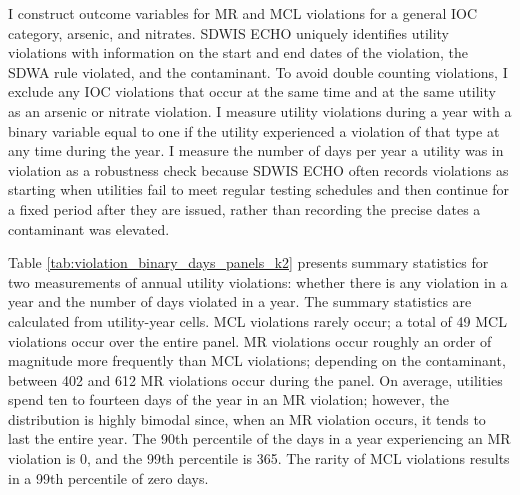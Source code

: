 \documentclass[12pt]{article}
\begin{document}
I construct outcome variables for MR and MCL violations for a general IOC category, arsenic, and nitrates. SDWIS ECHO uniquely identifies utility violations with information on the start and end dates of the violation, the SDWA rule violated, and the contaminant. To avoid double counting violations, I exclude any IOC violations that occur at the same time and at the same utility as an arsenic or nitrate violation. I measure utility violations during a year with a binary variable equal to one if the utility experienced a violation of that type at any time during the year. I measure the number of days per year a utility was in violation as a robustness check because SDWIS ECHO often records violations as starting when utilities fail to meet regular testing schedules and then continue for a fixed period after they are issued, rather than recording the precise dates a contaminant was elevated. 


Table \ref{tab:violation_binary_days_panels_k2} presents summary statistics for two measurements of annual utility violations: whether there is any violation in a year and the number of days violated in a year. The summary statistics are calculated from utility-year cells. MCL violations rarely occur; a total of 49 MCL violations occur over the entire panel. MR violations occur roughly an order of magnitude more frequently than MCL violations; depending on the contaminant, between 402 and 612 MR violations occur during the panel. On average, utilities spend ten to fourteen days of the year in an MR violation; however, the distribution is highly bimodal since, when an MR violation occurs, it tends to last the entire year. The 90th percentile of the days in a year experiencing an MR violation is 0, and the 99th percentile is 365. The rarity of MCL violations results in a 99th percentile of zero days.

\end{document}
